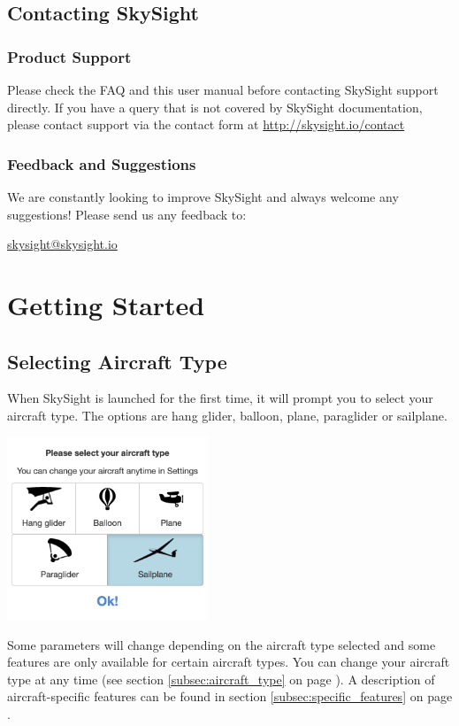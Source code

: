\documentclass[11pt,a4paper]{article}
\begin{document}
\subsection{Contacting SkySight}
\subsubsection{Product Support}
Please check the FAQ and this user manual before contacting SkySight support directly. If you have a query that is not covered by SkySight documentation, please contact support via the contact form at \url{http://skysight.io/contact}
\subsubsection{Feedback and Suggestions}
We are constantly looking to improve SkySight and always welcome any suggestions! Please send us any feedback to: 
\begin{flushleft}
\url{skysight@skysight.io}
\end{flushleft}
\section{Getting Started}

\subsection{Selecting Aircraft Type}
When SkySight is launched for the first time, it will prompt you to select your aircraft type. The options are hang glider, balloon, plane, paraglider or sailplane. 
\begin{center}
\includegraphics[width=6cm]{images/aircraft_type.png}
\end{center}
Some parameters will change depending on the aircraft type selected and some features are only available for certain aircraft types. You can change your aircraft type at any time (see section \ref{subsec:aircraft_type} on page \pageref{subsec:aircraft_type}). A description of aircraft-specific features can be found in section \ref{subsec:specific_features} on page \pageref{subsec:specific_features}.
\end{document}
